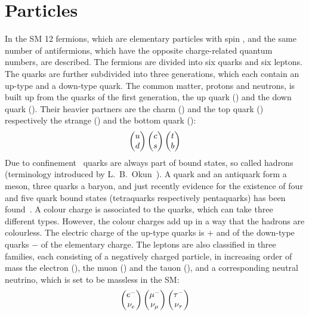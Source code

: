 
\section{Particles}
\label{sec:standardmodel:particles}

In the SM 12 fermions, which are elementary particles with spin ,
and the same number of antifermions, which have the opposite charge-related
quantum numbers, are described. The fermions are divided into six quarks and
six leptons. The quarks are further subdivided into three generations, which
each contain an up-type and a down-type quark. The common matter, protons and
neutrons, is built up from the quarks of the first generation, the up quark
(\uquark) and the down quark (\dquark). Their heavier partners are the charm
(\cquark) and the top quark (\tquark) respectively the strange (\squark) and
the bottom quark (\bquark):
\begin{align}
\begin{pmatrix}
{\ensuremath{u}} \\ {d}
\end{pmatrix}
\begin{pmatrix}
{\ensuremath{c}} \\ {s}
\end{pmatrix}
\begin{pmatrix}
{\ensuremath{t}}	\\ {b}
\end{pmatrix}
\end{align}
Due to confinement~\cite{Confinement} quarks are always part of bound states,
so called hadrons (terminology introduced by L.~B.~Okun~\cite{Okun:1962kca}).
A quark and an antiquark form a meson, three quarks a baryon, and just
recently evidence for the existence of four and five quark bound states
(tetraquarks respectively pentaquarks) has been
found~\cite{LHCb-PAPER-2016-018,*LHCb-PAPER-2016-019,LHCb-PAPER-2015-029,LHCb-PAPER-2016-015}.
A colour charge is associated to the quarks, which can take three different
types. However, the colour charges add up in a way that the hadrons are
colourless. The electric charge of the up-type quarks is + and of
the down-type quarks $-$ of the elementary charge. The leptons are
also classified in three families, each consisting of a negatively charged
particle, in increasing order of mass the electron (\electron), the muon
(\muon) and the tauon (\tauon), and a corresponding neutral neutrino, which is
set to be massless in the SM:
\begin{align}
\begin{pmatrix}
{\ensuremath{e^-}} \\ {{\nu}_e}
\end{pmatrix}
\begin{pmatrix}
{\ensuremath{\mu^-}} \\ {{\nu}_\mu}
\end{pmatrix}
\begin{pmatrix}
{\ensuremath{\tau^-}} \\ {{\nu}_\tau}
\end{pmatrix}
\end{align}
